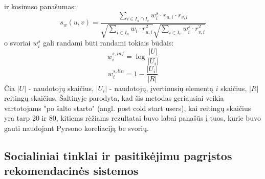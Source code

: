 \documentclass{VUMIFInfMagistrinis}
\begin{document}
ir kosinuso panašumas:
\begin{equation}
s_w(u,v) = \frac{\sum \limits_{i\in I_u \cap I_v} w_i^s \cdot r_{u,i} \cdot r_{v,i}}{\sqrt{\sum\limits_{i \in I_u} w_i \cdot r_{u,i}^2}\sqrt{\sum\limits_{i \in I_v} w_i^s \cdot r_{v,i}^2}}
\end{equation}
o svoriai $w_i^s$ gali randami būti randami tokiais būdais:
\begin{equation}
w_i^{s,inf} = \log \frac{|U|}{|U_i|}
\end{equation}
\begin{equation}
w_i^{s,lin} = 1 - \frac{|U_i|}{|R|}
\end{equation}
Čia $|U|$ - naudotojų skaičius, $|U_i|$ - naudotojų, įvertinusių elementą $i$ skaičius, $|R|$ reitingų skaičius.
\newline
\indent
Šaltinyje \cite{13} parodyta, kad šis metodas geriausiai veikia vartotojams "po šalto starto" (angl. post cold start users), kai reitingų skaičius yra tarp 20 ir 80, kitiems rėžiams rezultatai buvo labai panašūs į tuos, kurie buvo gauti naudojant Pyrsono koreliaciją be svorių.  

\subsection{Socialiniai tinklai ir pasitikėjimu pagrįstos rekomendacinės sistemos}
\end{document}
